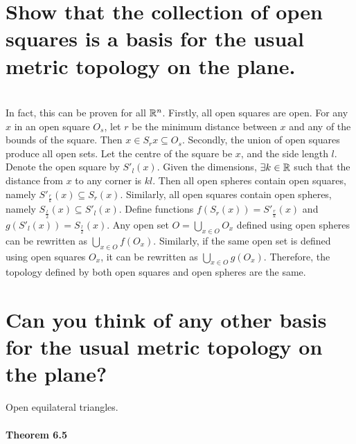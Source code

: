 \begin{parts}
 \part{Show that the collection of open squares is a basis for the usual metric topology on the plane.}
 
\begin{solution}
 \\In fact, this can be proven for all $\mathbb{R}^n$. Firstly, all open squares are open. For any $x$ in an open square $O_s$, let $r$ be the minimum distance between $x$ and any of the bounds of the square. Then $x \in S_r{x} \subseteq O_s$. Secondly, the union of open squares produce all open sets. Let the centre of the square be $x$, and the side length $l$. Denote the open square by $S'_l(x)$. Given the dimensions, $\exists k \in \mathbb{R}$ such that the distance from $x$ to any corner is $kl$. Then all open spheres contain open squares, namely $S'_{\frac{r}{k}}(x) \subseteq S_r(x)$. Similarly, all open squares contain open spheres, namely $S_{\frac{l}{2}}(x) \subseteq S'_l(x)$. Define functions $f(S_r(x)) = S'_{\frac{r}{k}}(x)$ and $g(S'_l(x)) = S_{\frac{l}{2}}(x)$. Any open set $O = \bigcup_{x \in O} O_x$ defined using open spheres can be rewritten as $\bigcup_{x \in O} f(O_x)$. Similarly, if the same open set is defined using open squares $O_x$, it can be rewritten as $\bigcup_{x \in O} g(O_x)$. Therefore, the topology defined by both open squares and open spheres are the same.
 \end{solution}
 
 \part{Can you think of any other basis for the usual metric topology on the plane?}
 
\begin{solution}
 Open equilateral triangles.
\end{solution}
\end{parts}

\subsection{Theorem 6.5}
\setcounter{question}{0}


